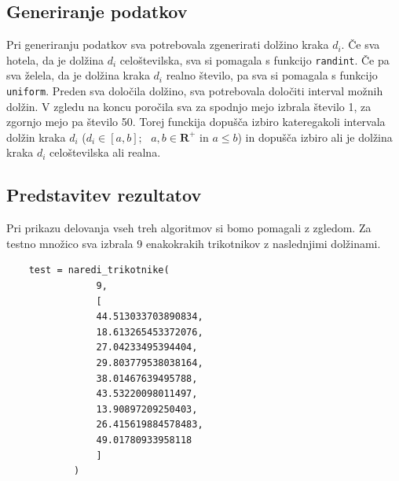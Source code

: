 \documentclass[a4paper,12pt]{article}
\theoremstyle{definition}
\theoremstyle{plain}
\begin{document}
\subsection{Generiranje podatkov}
Pri generiranju podatkov sva potrebovala zgenerirati dolžino kraka $d_{i}$. Če sva hotela, da je dolžina $d_{i}$
celoštevilska, sva si pomagala s funkcijo \texttt{randint}. Če pa sva želela, da je dolžina kraka $d_{i}$ realno število,
pa sva si pomagala s funkcijo \texttt{uniform}. Preden sva določila dolžino, sva potrebovala določiti
interval možnih dolžin. V zgledu na koncu poročila sva za spodnjo mejo izbrala število 1, za
zgornjo mejo pa število 50. 
Torej funckija dopušča izbiro kateregakoli intervala dolžin kraka $d_{i}$ 
($d_{i} \in [a,b]; \text{ } a, b \in \mathbf{R}^+  \text{ in } a \leq b$) in dopušča izbiro ali je dolžina kraka $d_{i}$ celoštevilska
ali realna.

\newpage

\subsection{Predstavitev rezultatov}
Pri prikazu delovanja vseh treh algoritmov si bomo pomagali z zgledom.
Za testno množico sva izbrala 9 enakokrakih trikotnikov z naslednjimi dolžinami.

\begin{verbatim}
    test = naredi_trikotnike(
                9,
                [ 
                44.513033703890834,
                18.613265453372076,
                27.04233495394404,
                29.803779538038164,
                38.01467639495788,
                43.53220098011497,
                13.90897209250403,
                26.415619884578483,
                49.01780933958118
                ]
            )
\end{verbatim}
\end{document}
